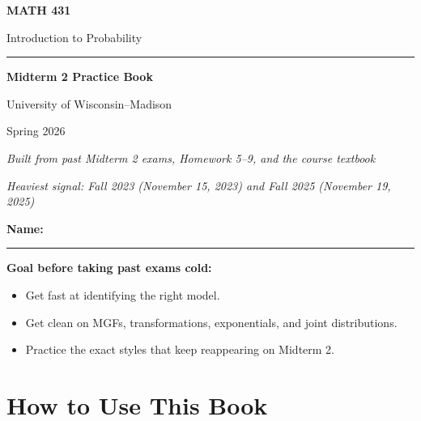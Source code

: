 \documentclass[12pt]{article}
\begin{document}
\hypersetup{pageanchor=false}

\begin{titlepage}
\thispagestyle{empty}
\centering
\vspace*{1.8cm}
{\Huge\bfseries MATH 431\par}
\vspace{0.35cm}
{\Large Introduction to Probability\par}
\vspace{1.15cm}
\rule{0.68\linewidth}{1pt}\par
\vspace{1.15cm}
{\huge\bfseries Midterm 2 Practice Book\par}
\vspace{0.85cm}
{\large University of Wisconsin--Madison\par}
{\large Spring 2026\par}
\vspace{1.5cm}
{\large\itshape Built from past Midterm 2 exams, Homework 5--9, and the course textbook\par}
\vspace{0.35cm}
{\normalsize\itshape Heaviest signal: Fall 2023 (November 15, 2023) and Fall 2025 (November 19, 2025)\par}
\vfill
\begin{flushleft}
\textbf{Name:} \rule{0.74\linewidth}{0.5pt}\par
\vspace{0.8cm}
\textbf{Goal before taking past exams cold:}\par
\smallskip
\begin{itemize}
  \item Get fast at identifying the right model.
  \item Get clean on MGFs, transformations, exponentials, and joint distributions.
  \item Practice the exact styles that keep reappearing on Midterm 2.
\end{itemize}
\end{flushleft}
\vfill
\end{titlepage}

\hypersetup{pageanchor=true}

\tableofcontents
\clearpage

\section*{How to Use This Book}
\end{document}
